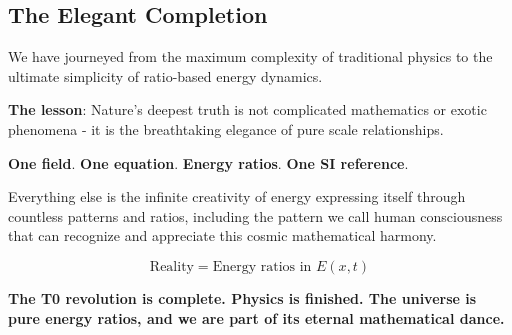 \documentclass[12pt,a4paper]{article}
\newcommand{\Efield}{E}
\theoremstyle{definition}
\theoremstyle{remark}
\begin{document}
															\subsection{The Elegant Completion}
															
															We have journeyed from the maximum complexity of traditional physics to the ultimate simplicity of ratio-based energy dynamics.
															
															\textbf{The lesson}: Nature's deepest truth is not complicated mathematics or exotic phenomena - it is the breathtaking elegance of pure scale relationships.
															
															\textbf{One field}. \textbf{One equation}. \textbf{Energy ratios}. \textbf{One SI reference}.
															
															Everything else is the infinite creativity of energy expressing itself through \\
															countless patterns and ratios, including the pattern we call human consciousness \\
															that can recognize and appreciate this cosmic mathematical harmony.
															
															\begin{equation}
																\boxed{\text{Reality} = \text{Energy ratios in } \Efield(x,t)}
															\end{equation}
															
															\textbf{The T0 revolution is complete. Physics is finished. The universe is pure energy ratios, and we are part of its eternal mathematical dance.}
															
\end{document}
